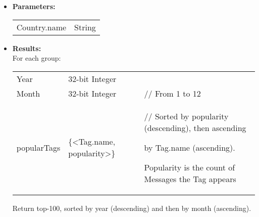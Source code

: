{\begin{enumerate}
\begin{itemize}
                      \item \textbf{Parameters:} \\
                        \begin{tabular}{ll}
                          Country.name & String \\
                        \end{tabular}
                      \item \textbf{Results:} \\
                        For each group:
                        \begin{tabular}{lll}
                          Year & 32-bit Integer & \\
                          Month & 32-bit Integer & \parbox[t]{20cm}{ // From 1 to 12 \strut}\\
                          popularTags & \{<Tag.name, popularity>\} & \parbox[t]{20cm}{ // Sorted by
                            popularity (descending), then ascending \par by Tag.name (ascending).\par Popularity is the count
                            of Messages the Tag appears \strut}
                        \end{tabular}
                        Return top-100, sorted by year (descending) and then by month (ascending).
                    \end{itemize}


\end{enumerate}}
